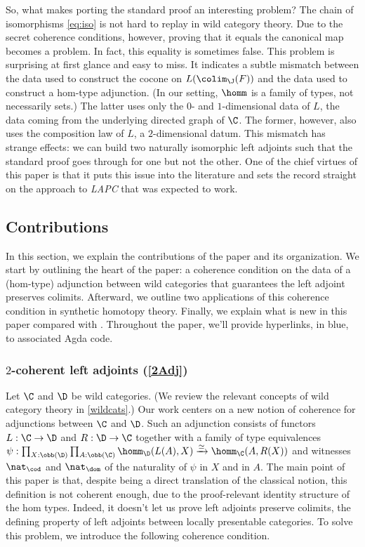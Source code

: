 \documentclass{lmcs}
\theoremstyle{definition}\newtheorem{note}[thm]{Note}
\begin{document}
So, what makes porting the standard proof an interesting problem? The chain of isomorphisms \eqref{eq:iso} is not hard to replay in wild category theory. Due to the secret coherence conditions, however, proving that it equals the canonical map becomes a problem. In fact, this equality is sometimes false. This problem is surprising at first glance and easy to miss. It indicates a subtle mismatch between the data used to construct the cocone on $L(\colim_{\J}(F))$ and the data used to construct a hom-type adjunction. (In our setting, $\homm$ is a family of types, not necessarily sets.) The latter uses only the $0$- and $1$-dimensional data of $L$, the data coming from the underlying directed graph of $\C$. The former, however, also uses the composition law of $L$, a $2$-dimensional datum. This mismatch has strange effects: we can build two naturally isomorphic left adjoints such that the standard proof goes through for one but not the other. One of the chief virtues of this paper is that it puts this issue into the literature and sets the record straight on the approach to \emph{LAPC} that was expected to work.

\subsection{Contributions}

In this section, we explain the contributions of the paper and its organization. We start by outlining the heart of the paper: a coherence condition on the data of a (hom-type) adjunction between wild categories that guarantees the left adjoint preserves colimits. Afterward, we outline two applications of this coherence condition in synthetic homotopy theory. Finally, we explain what is new in this paper compared with \cite{lapccsl}. Throughout the paper, we'll provide hyperlinks, in blue, to associated Agda code. 

\subsubsection{$2$-coherent left adjoints (\autoref{2Adj})}

Let $\C$ and $\D$ be wild categories. (We review the relevant concepts of wild category theory in \cref{wildcats}.) Our work centers on a new notion of coherence for adjunctions between $\C$ and $\D$.  Such an adjunction consists of functors $L : \C \to \D$ and $R : \D \to \C$ together with
a family of type equivalences $\psi : \prod_{X : \obb(\D)}\prod_{ A : \obb(\C)}\homm_{\D}(L(A), X) \xrightarrow{\simeq} \homm_{\C}(A,R(X))$ and witnesses $\nat_{\cod}$ and $\nat_{\dom}$ of the naturality of $\psi$ in $X$ and in $A$. The main point of this paper is that, despite being a direct translation of the classical notion, this definition is not coherent enough, due to the proof-relevant identity structure of the hom types. Indeed, it doesn't let us prove left adjoints preserve colimits, the defining property of left adjoints between locally presentable categories.
To solve this problem, we introduce the following coherence condition.
\end{document}
